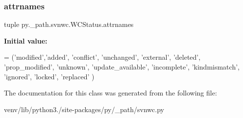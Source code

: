 \subsubsection{\texorpdfstring{attrnames}{attrnames}}
{\footnotesize\ttfamily tuple py.\+\_\+path.\+svnwc.\+W\+C\+Status.\+attrnames\hspace{0.3cm}{\ttfamily [static]}}

{\bfseries Initial value\+:}
\begin{DoxyCode}
=  (\textcolor{stringliteral}{'modified'},\textcolor{stringliteral}{'added'}, \textcolor{stringliteral}{'conflict'}, \textcolor{stringliteral}{'unchanged'}, \textcolor{stringliteral}{'external'},
                \textcolor{stringliteral}{'deleted'}, \textcolor{stringliteral}{'prop\_modified'}, \textcolor{stringliteral}{'unknown'}, \textcolor{stringliteral}{'update\_available'},
                \textcolor{stringliteral}{'incomplete'}, \textcolor{stringliteral}{'kindmismatch'}, \textcolor{stringliteral}{'ignored'}, \textcolor{stringliteral}{'locked'}, \textcolor{stringliteral}{'replaced'}
                )
\end{DoxyCode}


The documentation for this class was generated from the following file\+:\begin{DoxyCompactItemize}
\item 
venv/lib/python3./site-\/packages/py/\+\_\+path/svnwc.\+py\end{DoxyCompactItemize}
